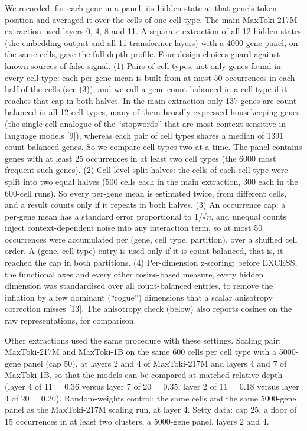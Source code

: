 \documentclass[
  11pt,
]{article}
\begin{document}
We recorded, for each gene in a panel, its hidden state at that gene's
token position and averaged it over the cells of one cell type. The main
MaxToki-217M extraction used layers 0, 4, 8 and 11. A separate
extraction of all 12 hidden states (the embedding output and all 11
transformer layers) with a 4000-gene panel, on the same cells, gave the
full depth profile. Four design choices guard against known sources of
false signal. (1) Pairs of cell types, not only genes found in every
cell type: each per-gene mean is built from at most 50 occurrences in
each half of the cells (see (3)), and we call a gene count-balanced in a
cell type if it reaches that cap in both halves. In the main extraction
only 137 genes are count-balanced in all 12 cell types, many of them
broadly expressed housekeeping genes (the single-cell analogue of the
``stopwords'' that are most context-sensitive in language models
{[}9{]}), whereas each pair of cell types shares a median of 1391
count-balanced genes. So we compare cell types two at a time. The panel
contains genes with at least 25 occurrences in at least two cell types
(the 6000 most frequent such genes). (2) Cell-level split halves: the
cells of each cell type were split into two equal halves (500 cells each
in the main extraction, 300 each in the 600-cell runs). So every
per-gene mean is estimated twice, from different cells, and a result
counts only if it repeats in both halves. (3) An occurrence cap: a
per-gene mean has a standard error proportional to 1/√\emph{n}, and
unequal counts inject context-dependent noise into any interaction term,
so at most 50 occurrences were accumulated per (gene, cell type,
partition), over a shuffled cell order. A (gene, cell type) entry is
used only if it is count-balanced, that is, it reached the cap in both
partitions. (4) Per-dimension z-scoring: before EXCESS, the functional
axes and every other cosine-based measure, every hidden dimension was
standardised over all count-balanced entries, to remove the inflation by
a few dominant (``rogue'') dimensions that a scalar anisotropy
correction misses {[}13{]}. The anisotropy check (below) also reports
cosines on the raw representations, for comparison.

Other extractions used the same procedure with these settings. Scaling
pair: MaxToki-217M and MaxToki-1B on the same 600 cells per cell type
with a 5000-gene panel (cap 50), at layers 2 and 4 of MaxToki-217M and
layers 4 and 7 of MaxToki-1B, so that the models can be compared at
matched relative depth (layer 4 of 11 = 0.36 versus layer 7 of 20 =
0.35; layer 2 of 11 = 0.18 versus layer 4 of 20 = 0.20). Random-weights
control: the same cells and the same 5000-gene panel as the MaxToki-217M
scaling run, at layer 4. Setty data: cap 25, a floor of 15 occurrences
in at least two clusters, a 5000-gene panel, layers 2 and 4.
\end{document}
